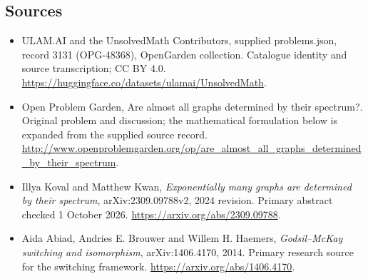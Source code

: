 \documentclass[11pt,a4paper]{article}
\begin{document}
\subsection{Sources}
\begin{itemize}
\item[S1] ULAM.AI and the UnsolvedMath Contributors, supplied problems.json, record 3131 (OPG-48368), OpenGarden collection. Catalogue identity and source transcription; CC BY 4.0.
\url{https://huggingface.co/datasets/ulamai/UnsolvedMath}.
\item[S2] Open Problem Garden, Are almost all graphs determined by their spectrum?. Original problem and discussion; the mathematical formulation below is expanded from the supplied source record.
\url{http://www.openproblemgarden.org/op/are_almost_all_graphs_determined_by_their_spectrum}.

\item[R1] Illya Koval and Matthew Kwan, \emph{Exponentially many
graphs are determined by their spectrum}, arXiv:2309.09788v2,
2024 revision. Primary abstract checked 1 October 2026.
\url{https://arxiv.org/abs/2309.09788}.
\item[R2] Aida Abiad, Andries E. Brouwer and Willem H. Haemers,
\emph{Godsil--McKay switching and isomorphism}, arXiv:1406.4170,
2014. Primary research source for the switching framework.
\url{https://arxiv.org/abs/1406.4170}.

\end{itemize}
\end{document}
